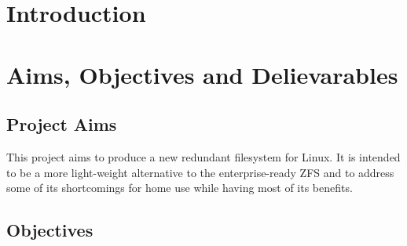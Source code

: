 %
%
\section{Introduction}




%
%
\section{Aims, Objectives and Delievarables}

\subsection{Project Aims}

    This project aims to produce a new redundant filesystem for Linux. It is
    intended to be a more light-weight alternative to the enterprise-ready ZFS
    and to address some of its shortcomings for home use while having most of
    its benefits.

\subsection{Objectives}

